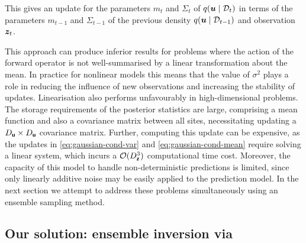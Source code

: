 \documentclass{article}
\theoremstyle{plain}
\theoremstyle{definition}
\theoremstyle{remark}
\begin{document}
This gives an update for the parameters $m_t$ and $\Sigma_t$ of $q(\boldsymbol{u} \mid \mathcal{D}_t)$ in terms of the parameters $m_{t-1}$ and $\Sigma_{t-1}$ of the previous density $q(\boldsymbol{u} \mid \mathcal{D}_{t-1})$ and observation $\boldsymbol{z}_t$.

This approach can produce inferior results for problems where the action of the forward operator is not well-summarised by a linear transformation about the mean.
In practice for nonlinear models this means that the value of \(\sigma^2\) plays a role in reducing the influence of new observations and increasing the stability of updates.
Linearisation also performs unfavourably in high-dimensional problems.
The storage requirements of the  posterior statistics are large, comprising a mean function and also a covariance matrix between all sites, necessitating updating a \(D_{\boldsymbol{\mathsf{u}}}\times D_{\boldsymbol{\mathsf{u}}}\) covariance matrix.
Further, computing this update can be  expensive, as the updates in \eqref{eq:gaussian-cond-var} and \eqref{eq:gaussian-cond-mean} require solving a linear system, which incurs a \(\mathcal{O}(D_{\boldsymbol{\mathsf{\boldsymbol{\mathsf{z}}}}}^3)\) computational time cost.
Moreover, the capacity of this model to handle non-deterministic predictions is limited, since only linearly additive noise may be easily applied to the prediction model.
In the next section we attempt to address these problems simultaneously using an ensemble sampling method.

\subsection{Our solution: ensemble inversion via \meth{}}\label{sec:EnsembleInversion}

\end{document}
